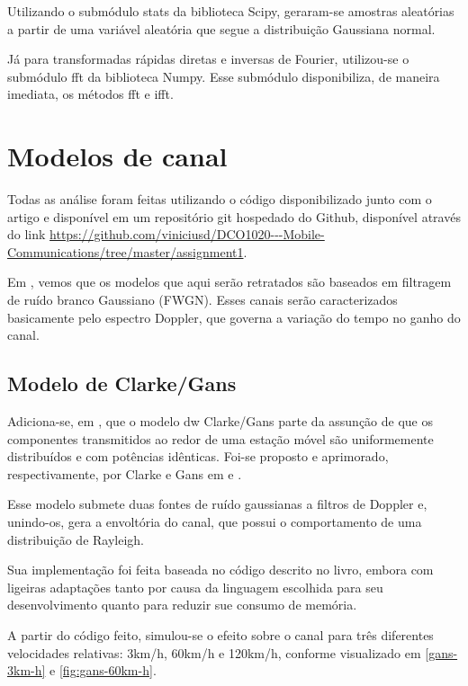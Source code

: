 \documentclass[journal,11pt,twocolumn]{IEEEtran}
\begin{document}
Utilizando o submódulo stats da biblioteca Scipy, geraram-se amostras aleatórias a partir de uma variável aleatória que segue a distribuição Gaussiana normal.

Já para transformadas rápidas diretas e inversas de Fourier, utilizou-se o submódulo fft da biblioteca Numpy. Esse submódulo disponibiliza, de maneira imediata, os métodos fft e ifft.

\section{Modelos de canal}
Todas as análise foram feitas utilizando o código disponibilizado junto com o artigo e disponível em um repositório git hospedado do Github, disponível através do link \url{https://github.com/viniciusd/DCO1020---Mobile-Communications/tree/master/assignment1}.

Em \cite{mimo}, vemos que os modelos que aqui serão retratados são baseados em filtragem de ruído branco Gaussiano (FWGN). Esses canais serão caracterizados basicamente pelo espectro Doppler, que governa a variação do tempo no ganho do canal.
\subsection{Modelo de Clarke/Gans}

Adiciona-se, em \cite{mimo}, que o modelo dw Clarke/Gans parte da assunção de que os componentes transmitidos ao redor de uma estação móvel são uniformemente distribuídos e com potências idênticas. Foi-se proposto e aprimorado, respectivamente, por Clarke e Gans em \cite{clarke} e \cite{gans}.

Esse modelo submete duas fontes de ruído gaussianas a filtros de Doppler e, unindo-os, gera a envoltória do canal, que possui o comportamento de uma distribuição de Rayleigh.

Sua implementação foi feita baseada no código descrito no livro, embora com ligeiras adaptações tanto por causa da linguagem escolhida para seu desenvolvimento quanto para reduzir sue consumo de memória.

A partir do código feito, simulou-se o efeito sobre o canal para três diferentes velocidades relativas: 3km/h, 60km/h e 120km/h, conforme visualizado em \ref{gans-3km-h} e \ref{fig:gans-60km-h}.
\end{document}
